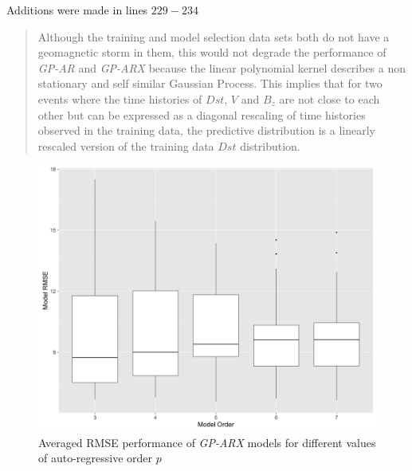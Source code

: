 \documentclass{article}
\begin{document}
\begin{enumerate}
Additions were made in lines $229-234$ \blockquote{Although the training and model selection data sets both do not have a geomagnetic storm in them, this would not degrade the performance of \emph{GP-AR} and \emph{GP-ARX} because the linear polynomial kernel describes a non stationary and self similar Gaussian Process. This implies that for two events where the time histories of $Dst$, $V$ and $B_z$ are not close to each other but can be expressed as a diagonal rescaling of time histories observed in the training data, the predictive distribution is a linearly rescaled version of the training data $Dst$ distribution.}


\begin{figure}
   \centering
   \includegraphics[width=\textwidth]{Model_RMSE_validationStorms}
      \caption{Averaged RMSE performance of \emph{GP-ARX} models for different values of auto-regressive order $p$}
         \label{fig:prmse}
 \end{figure}



\end{enumerate}
\end{document}
